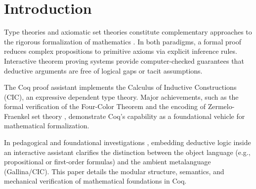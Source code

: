 \section{Introduction}
\label{sec:introduction}

Type theories and axiomatic set theories constitute complementary approaches to the rigorous formalization of mathematics \cite{jech1978settheory, mendelson1997logic}. In both paradigms, a formal proof reduces complex propositions to primitive axioms via explicit inference rules. Interactive theorem proving systems provide computer-checked guarantees that deductive arguments are free of logical gaps or tacit assumptions.

The Coq proof assistant \cite{coq2024refman} implements the Calculus of Inductive Constructions (CIC), an expressive dependent type theory. Major achievements, such as the formal verification of the Four-Color Theorem \cite{gonthier2008fourcolor} and the encoding of Zermelo-Fraenkel set theory \cite{werner1997zfc}, demonstrate Coq's capability as a foundational vehicle for mathematical formalization.

In pedagogical and foundational investigations \cite{krupski2019coq, krupski2013algorithms}, embedding deductive logic inside an interactive assistant clarifies the distinction between the object language (e.g., propositional or first-order formulas) and the ambient metalanguage (Gallina/CIC). This paper details the modular structure, semantics, and mechanical verification of mathematical foundations in Coq.
